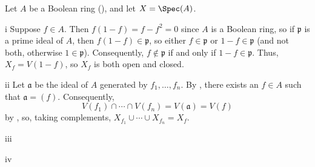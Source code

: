\begin{exercise}
Let \(A\) be a Boolean ring (), and let \(X = \Spec(A)\).
\end{exercise}

\begin{partsolution}{i}
Suppose \(f \in A\).
Then \(f(1 - f) = f - f^2 = 0\) since \(A\) is a Boolean ring, so if \(\mathfrak{p}\) is a prime ideal of \(A\), then \(f(1 - f) \in \mathfrak{p}\), so either \(f \in \mathfrak{p}\) or \(1 - f \in \mathfrak{p}\) (and not both, otherwise \(1 \in \mathfrak{p}\)).
Consequently, \(f \notin \mathfrak{p}\) if and only if \(1 - f \in \mathfrak{p}\).
Thus, \(X_f = V(1 - f)\), so \(X_f\) is both open and closed.
\end{partsolution}

\begin{partsolution}{ii}
Let \(\mathfrak{a}\) be the ideal of \(A\) generated by \(f_1, \ldots, f_n\).
By , there exists an \(f \in A\) such that \(\mathfrak{a} = (f)\).
Consequently,
\begin{equation*}
V(f_1) \cap \cdots \cap V(f_n)
= V(\mathfrak{a})
= V(f)
\end{equation*}
by , so, taking complements, \(X_{f_1} \cup \cdots \cup X_{f_n} = X_f\).
\end{partsolution}

\begin{partsolution}{iii}

\end{partsolution}

\begin{partsolution}{iv}

\end{partsolution}